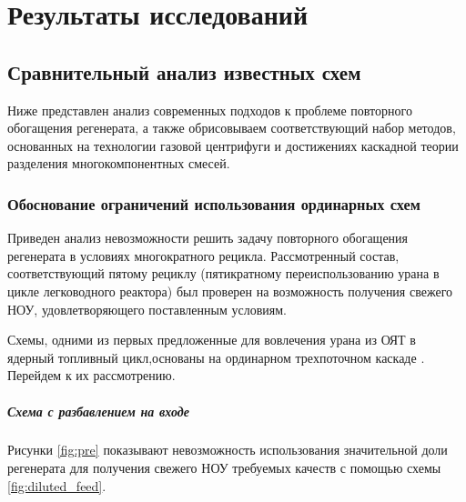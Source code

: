 \chapter{Результаты исследований}\label{ch:ch1}

      
\section{Сравнительный анализ известных схем}\label{sec:ch1/sec2}
Ниже представлен анализ современных подходов к проблеме повторного обогащения регенерата, а также обрисовываем соответствующий набор методов, основанных на технологии газовой центрифуги и достижениях каскадной теории разделения многокомпонентных смесей.
\subsection{Обоснование ограничений использования ординарных схем}\label{sec:ch1/sec2.1}
Приведен анализ невозможности решить задачу повторного обогащения регенерата в условиях многократного рецикла. Рассмотренный состав, соответствующий пятому рециклу (пятикратному переиспользованию урана в цикле легководного реактора) был проверен на возможность получения свежего НОУ, удовлетворяющего поставленным условиям.

Схемы, одними из первых предложенные для вовлечения урана из ОЯТ в ядерный топливный цикл,основаны на ординарном трехпоточном каскаде \cite{__2012}. Перейдем к их рассмотрению.
\paragraph{Схема с разбавлением на входе}
Рисунки \ref{fig:pre} показывают невозможность использования значительной доли регенерата для получения свежего НОУ требуемых качеств с помощью схемы \ref{fig:diluted_feed}.

